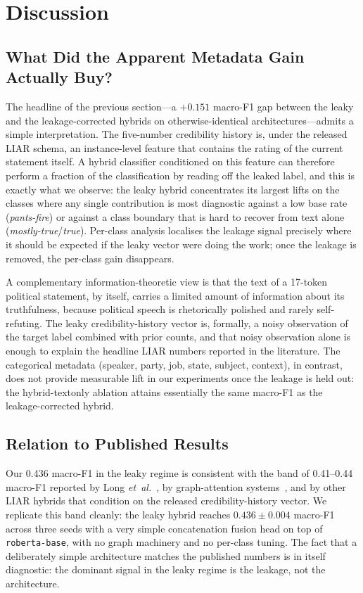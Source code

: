 \documentclass[journal]{IEEEtran}
\begin{document}
\section{Discussion}
\label{sec:discussion}

\subsection{What Did the Apparent Metadata Gain Actually Buy?}
The headline of the previous section---a $+0.151$ macro-F1 gap between the leaky and the leakage-corrected hybrids on otherwise-identical architectures---admits a simple interpretation. The five-number credibility history is, under the released LIAR schema, an instance-level feature that contains the rating of the current statement itself. A hybrid classifier conditioned on this feature can therefore perform a fraction of the classification by reading off the leaked label, and this is exactly what we observe: the leaky hybrid concentrates its largest lifts on the classes where any single contribution is most diagnostic against a low base rate (\emph{pants-fire}) or against a class boundary that is hard to recover from text alone (\emph{mostly-true}/\emph{true}). Per-class analysis localises the leakage signal precisely where it should be expected if the leaky vector were doing the work; once the leakage is removed, the per-class gain disappears.

A complementary information-theoretic view is that the text of a 17-token political statement, by itself, carries a limited amount of information about its truthfulness, because political speech is rhetorically polished and rarely self-refuting. The leaky credibility-history vector is, formally, a noisy observation of the target label combined with prior counts, and that noisy observation alone is enough to explain the headline LIAR numbers reported in the literature. The categorical metadata (speaker, party, job, state, subject, context), in contrast, does not provide measurable lift in our experiments once the leakage is held out: the hybrid-textonly ablation attains essentially the same macro-F1 as the leakage-corrected hybrid.

\subsection{Relation to Published Results}
Our 0.436 macro-F1 in the leaky regime is consistent with the band of 0.41--0.44 macro-F1 reported by Long \emph{et~al.}~\cite{long2017fakenews}, by graph-attention systems~\cite{zhang2024heterosgt,gu2024,tong2025,zhang2024phd}, and by other LIAR hybrids that condition on the released credibility-history vector. We replicate this band cleanly: the leaky hybrid reaches $0.436 \pm 0.004$ macro-F1 across three seeds with a very simple concatenation fusion head on top of \texttt{roberta-base}, with no graph machinery and no per-class tuning. The fact that a deliberately simple architecture matches the published numbers is in itself diagnostic: the dominant signal in the leaky regime is the leakage, not the architecture.
\end{document}
